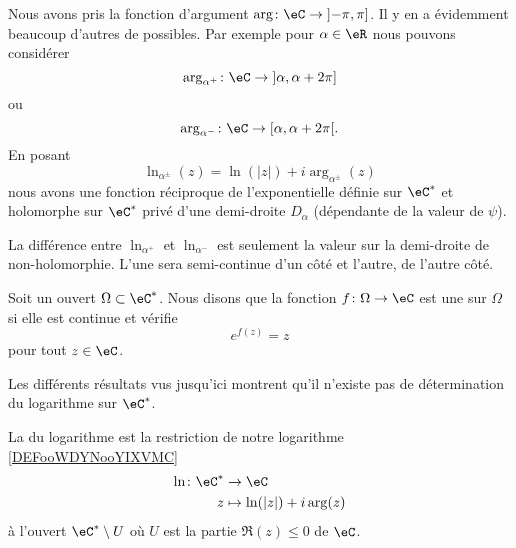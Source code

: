 Nous avons pris la fonction d'argument \( \arg\colon \eC\to \mathopen] -\pi , \pi \mathclose]\). Il y en a évidemment beaucoup d'autres de possibles. Par exemple pour \( \alpha\in \eR\) nous pouvons considérer
\begin{equation}
    \arg_{\alpha^+}\colon \eC\to \mathopen] \alpha , \alpha+2\pi \mathclose]
\end{equation}
ou
\begin{equation}
    \arg_{\alpha^-}\colon \eC\to \mathopen[ \alpha , \alpha+2\pi \mathclose[.
\end{equation}
En posant 
\begin{equation}
    \ln_{\alpha^{\pm}}(z)=\ln(| z |)+i\arg_{\alpha^{\pm}}(z)
\end{equation}
nous avons une fonction réciproque de l'exponentielle définie sur \( \eC^*\) et holomorphe sur \( \eC^*\) privé d'une demi-droite \( D_{\alpha}\) (dépendante de la valeur de \( \psi\)).

La différence entre \( \ln_{\alpha^+}\) et \( \ln_{\alpha^-}\) est seulement la valeur sur la demi-droite de non-holomorphie. L'une sera semi-continue d'un côté et l'autre, de l'autre côté.

\begin{definition}
    Soit un ouvert \( \Omega\subset \eC^*\). Nous disons que la fonction \( f\colon \Omega\to \eC\) est une  sur \( \Omega\) si elle est continue et vérifie
    \begin{equation}
        e^{f(z)}=z
    \end{equation}
    pour tout \( z\in \eC\).
\end{definition}

Les différents résultats vus jusqu'ici montrent qu'il n'existe pas de détermination du logarithme sur \( \eC^*\). 

\begin{definition}
    La  du logarithme est la restriction de notre logarithme \ref{DEFooWDYNooYIXVMC}
    \begin{equation}
        \begin{aligned}
            \ln\colon \eC^*&\to \eC \\
            z&\mapsto \ln(| z |)+i\arg(z) 
        \end{aligned}
    \end{equation}
    à l'ouvert \( \eC^*\setminus U\) où \( U\) est la partie \( \Re(z)\leq 0\) de \( \eC\).
\end{definition}

